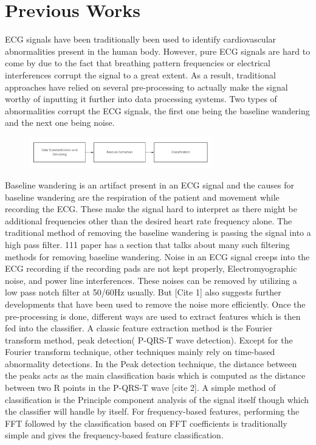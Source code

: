 \documentclass[10pt,twocolumn,letterpaper]{article}
\begin{document}
\section{Previous Works}
ECG signals have been traditionally been used to identify cardiovascular abnormalities present in the human body. However, pure ECG signals are hard to come by due to the fact that breathing pattern frequencies or electrical interferences corrupt the signal to a great extent. As a result, traditional approaches have relied on several pre-processing to actually make the signal worthy of inputting it further into data processing systems. Two types of abnormalities corrupt the ECG signals, the first one being the baseline wandering and the next one being noise. 

\begin{figure}[htbp]
\includegraphics[width=8cm]{traditional.png}
\end{figure}

Baseline wandering is an artifact present in an ECG signal and the causes for baseline wandering are the respiration of the patient and movement while recording the ECG. These make the signal hard to interpret as there might be additional frequencies other than the desired heart rate frequency alone. The traditional method of removing the baseline wandering is passing the signal into a high pass filter. 111 paper has a section that talks about many such filtering methods for removing baseline wandering.
Noise in an ECG signal creeps into the ECG recording if the recording pads are not kept properly, Electromyographic noise, and power line interferences. These noises can be removed by utilizing a low pass notch filter at 50/60Hz usually.  But [Cite 1] also suggests further developments that have been used to remove the noise more efficiently.
Once the pre-processing is done, different ways are used to extract features which is then fed into the classifier. A classic feature extraction method is the Fourier transform method, peak detection( P-QRS-T wave detection). Except for the Fourier transform technique, other techniques mainly rely on time-based abnormality detections.  In the Peak detection technique, the distance between the peaks acts as the main classification basis which is computed as the distance between two R points in the P-QRS-T wave [cite 2]. A simple method of classification is the Principle component analysis of the signal itself though which the classifier will handle by itself. For frequency-based features, performing the FFT followed by the classification based on FFT coefficients is traditionally simple and gives the frequency-based feature classification.
 
\end{document}
